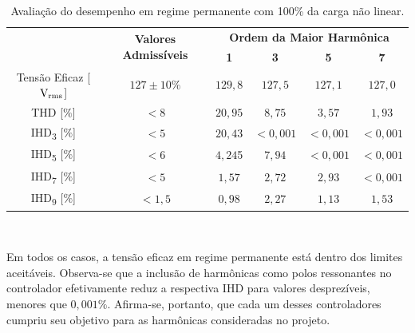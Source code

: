 \documentclass[repeatfields,oneside,overleaf]{tcc}
\begin{document}
\begin{table}[h]
    \centering
    \caption{Avaliação do desempenho em regime permanente com 100\% da carga não linear.}
    \begin{tabular}{c|c|c|c|c|c}
                                                      & \multirow{2}{0.18\linewidth}{\centering\textbf{Valores Admissíveis}} & \multicolumn{4}{c}{\textbf{Ordem da Maior Harmônica}} \\
                                                      &                                                                      & \textbf{1} & \textbf{3} & \textbf{5} & \textbf{7}     \\\hline
        Tensão Eficaz [$\text{V\textsubscript{rms}}$] & $127 \pm 10\%$                                                       & $129,8$    & $127,5$    & $127,1$    & $127,0$        \\\hline
        THD [$\%$]                                    & $<8$                                                                 & $20,95$    & $8,75$     & $3,57$     & $1,93$         \\\hline
        IHD\textsubscript{3} [$\%$]                   & $<5$                                                                 & $20,43$    & $<0,001$   & $< 0,001$  & $< 0,001$      \\\hline
        IHD\textsubscript{5} [$\%$]                   & $<6$                                                                 & $4,24$5    & $7,94$     & $< 0,001$  & $< 0,001$      \\\hline
        IHD\textsubscript{7} [$\%$]                   & $<5$                                                                 & $1,57$     & $2,72$     & $2,93$     & $< 0,001$      \\\hline
        IHD\textsubscript{9} [$\%$]                   & $<1,5$                                                               & $0,98$     & $2,27$     & $1,13$     & $1,53$         \\
    \end{tabular}
    \\\vspace{0.25cm}
    \label{tab:harm}
\end{table}

Em todos os casos, a tensão eficaz em regime permanente está dentro dos limites aceitáveis.
Observa-se que a inclusão de harmônicas como polos ressonantes no controlador efetivamente reduz a respectiva IHD para valores desprezíveis, menores que $0,001\%$.
Afirma-se, portanto, que cada um desses controladores cumpriu seu objetivo para as harmônicas consideradas no projeto.
\end{document}
